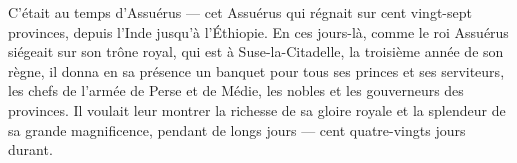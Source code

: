 C’était au temps d’Assuérus --- cet Assuérus qui régnait sur cent vingt-sept provinces,
	depuis l’Inde jusqu’à l’Éthiopie.
En ces jours-là,
		comme le roi Assuérus siégeait sur son trône royal, qui est à Suse-la-Citadelle,
	la troisième année de son règne,
	il donna en sa présence un banquet pour tous ses princes et ses serviteurs,
	les chefs de l’armée de Perse et de Médie,
	les nobles et les gouverneurs des provinces.
Il voulait leur montrer la richesse de sa gloire royale
	et la splendeur de sa grande magnificence,
	pendant de longs jours --- cent quatre-vingts jours durant.
